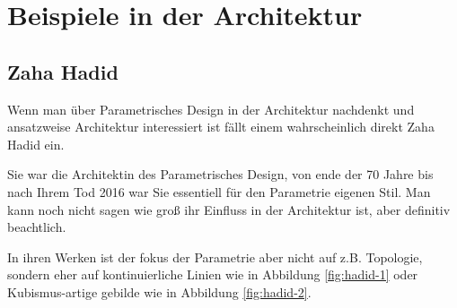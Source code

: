 \documentclass{article}
\begin{document}

\section{Beispiele in der Architektur}

    \subsection{Zaha Hadid}

    Wenn man \"uber Parametrisches Design in der Architektur nachdenkt und ansatzweise Architektur 
    interessiert ist f\"allt einem wahrscheinlich direkt Zaha Hadid ein.

    Sie war die Architektin des Parametrisches Design, von ende der 70 Jahre bis nach 
    Ihrem Tod 2016 war Sie essentiell f\"ur den Parametrie eigenen Stil. Man kann noch nicht sagen 
    wie gro\ss{} ihr Einfluss in der Architektur ist, aber definitiv beachtlich.

    In ihren Werken ist der fokus der Parametrie aber nicht auf z.B. Topologie, sondern eher auf 
    kontinuierliche Linien wie in Abbildung \ref{fig:hadid-1} oder
    Kubismus-artige gebilde wie in Abbildung \ref{fig:hadid-2}.
\end{document}
